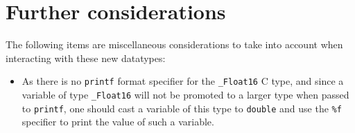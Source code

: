 \documentclass[../HDF5_RFC.tex]{subfiles}
\begin{document}
\section{Further considerations}
\label{considerations}

The following items are miscellaneous considerations to take into account when interacting with these
new datatypes:

\begin{itemize}
\item As there is no \texttt{printf} format specifier for the \texttt{\_Float16} C type, and since
a variable of type \texttt{\_Float16} will not be promoted to a larger type when passed to \texttt{printf},
one should cast a variable of this type to \texttt{double} and use the \texttt{\%f} specifier to print
the value of such a variable.

\end{itemize}
\end{document}
